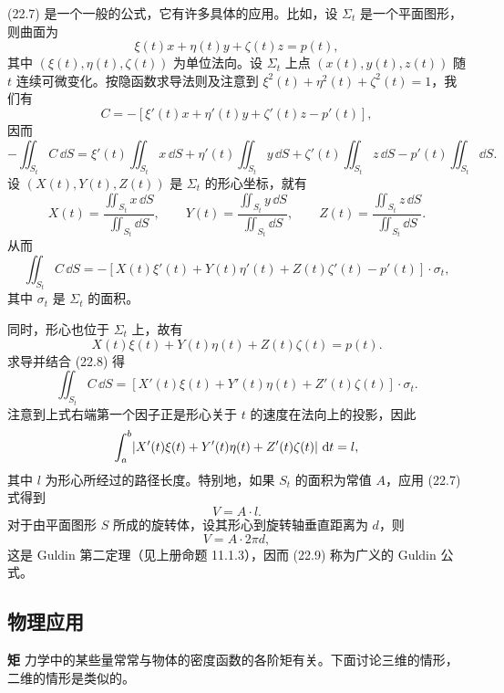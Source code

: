 \begin{xremark}
(22.7) 是一个一般的公式，它有许多具体的应用。比如，设 $\Sigma_t$ 是一个平面图形，则曲面为
\[
  \xi(t)x+\eta(t)y+\zeta(t)z=p(t),
\]
其中 $(\xi(t),\eta(t),\zeta(t))$ 为单位法向。设 $\Sigma_t$ 上点 $(x(t),y(t),z(t))$ 随 $t$ 连续可微变化。按隐函数求导法则及注意到 $\xi^2(t)+\eta^2(t)+\zeta^2(t)=1$，我们有
\[
  C=-[\xi'(t)x+\eta'(t)y+\zeta'(t)z-p'(t)],
\]
因而
\[
  -\iint_{S_t}C\,\dd S
  =\xi'(t)\iint_{S_t}x\,\dd S+\eta'(t)\iint_{S_t}y\,\dd S
  +\zeta'(t)\iint_{S_t}z\,\dd S-p'(t)\iint_{S_t}\dd S.
\]
设 $(X(t),Y(t),Z(t))$ 是 $\Sigma_t$ 的形心坐标，就有
\[
  X(t)=\frac{\iint_{S_t}x\,\dd S}{\iint_{S_t}\dd S},\qquad
  Y(t)=\frac{\iint_{S_t}y\,\dd S}{\iint_{S_t}\dd S},\qquad
  Z(t)=\frac{\iint_{S_t}z\,\dd S}{\iint_{S_t}\dd S}.
\]
从而
\begin{equation}
  \iint_{S_t}C\,\dd S
  =-[X(t)\xi'(t)+Y(t)\eta'(t)+Z(t)\zeta'(t)-p'(t)]\cdot\sigma_t,
  \tag{22.8}
  \label{eq:22.8}
\end{equation}
其中 $\sigma_t$ 是 $\Sigma_t$ 的面积。

同时，形心也位于 $\Sigma_t$ 上，故有
\[
  X(t)\xi(t)+Y(t)\eta(t)+Z(t)\zeta(t)=p(t).
\]
求导并结合 (22.8) 得
\[
  \iint_{S_t}C\,\dd S=[X'(t)\xi(t)+Y'(t)\eta(t)+Z'(t)\zeta(t)]\cdot\sigma_t.
\]
注意到上式右端第一个因子正是形心关于 $t$ 的速度在法向上的投影，因此
\[
  \int_a^b\lvert X'(t)\xi(t)+Y'(t)\eta(t)+Z'(t)\zeta(t)\rvert\,\mathop{}\!\mathrm{d} t=l,
\]
其中 $l$ 为形心所经过的路径长度。特别地，如果 $S_t$ 的面积为常值 $A$，应用 (22.7) 式得到
\begin{equation}
  V=A\cdot l.
  \tag{22.9}
  \label{eq:22.9}
\end{equation}
对于由平面图形 $S$ 所成的旋转体，设其形心到旋转轴垂直距离为 $d$，则
\[
  V=A\cdot2\pi d,
\]
这是 Guldin 第二定理（见上册命题 11.1.3），因而 (22.9) 称为广义的 Guldin 公式。
\end{xremark}

\subsection{物理应用}

\textbf{矩}
力学中的某些量常常与物体的密度函数的各阶矩有关。下面讨论三维的情形，二维的情形是类似的。

